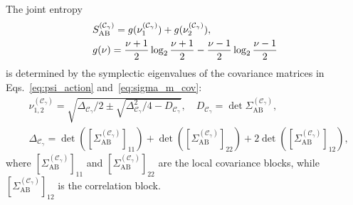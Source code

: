 \documentclass[%
final, 
superscriptaddress,
 amsmath,amssymb,amsfonts,
 aps,
 pra,
 longbibliography,
]{revtex4-2}
\newcommand{\ind}[1]{\mathrm{#1}}
\begin{document}
The joint entropy
\begin{align}
  &
  \label{eq:S_AB-gamma}
  S_{\ind{AB}}^{\left(\mathcal{C}_{\gamma}\right)}=g(\nu_1^{\left(\mathcal{C}_{\gamma}\right)})+g(\nu_2^{\left(\mathcal{C}_{\gamma}\right)}),
  \\
  &\notag
    g(\nu)=\frac{\nu+1}{2}\log_2 \frac{\nu+1}{2}-
    \frac{\nu-1}{2}\log_2\frac{\nu-1}{2}
\end{align}
is determined by the symplectic eigenvalues of the covariance matrices in Eqs.~\eqref{eq:psi_action} and~\eqref{eq:sigma_m_cov}:
\begin{align}
  &
    \label{eq:nu-12-gamma}
\nu_{1,2}^{\left(\mathcal{C}_{\gamma}\right)}
    =\sqrt{
\Delta_{\mathcal{C}_{\gamma}}/2\pm \sqrt{\Delta_{\mathcal{C}_{\gamma}}^2/4-D_{\mathcal{C}_{\gamma}}}
    },
    \quad
  D_{\mathcal{C}_{\gamma}}=\det \Sigma_{\ind{AB}}^{\left(\mathcal{C}_{\gamma}\right)},
    \\
  &
  \label{eq:D-gamma}
  \Delta_{\mathcal{C}_{\gamma}}=\det([\Sigma_{\ind{AB}}^{\left(\mathcal{C}_{\gamma}\right)}]_{11})+\det([\Sigma_{\ind{AB}}^{\left(\mathcal{C}_{\gamma}\right)}]_{22}) +
  2\det([\Sigma_{\ind{AB}}^{\left(\mathcal{C}_{\gamma}\right)}]_{12}),
\end{align}
where
$[\Sigma_{\ind{AB}}^{(\mathcal{C}_{\gamma})}]_{11}$
and
$[\Sigma_{\ind{AB}}^{(\mathcal{C}_{\gamma})}]_{22}$
are the local covariance blocks, while
$[\Sigma_{\ind{AB}}^{(\mathcal{C}_{\gamma})}]_{12}$
is the correlation block.
\end{document}
